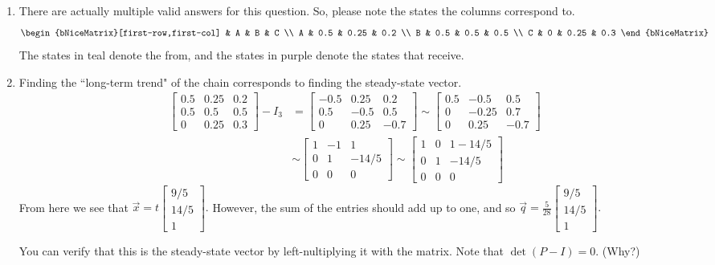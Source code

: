 \begin{enumerate}
	\item[\textbf{Q12}]  There are actually multiple valid answers for this question. So, please note the states the columns correspond to.
			\[
				\begin{bNiceMatrix}[first-row,first-col]
				   	&   A   &   B   &    C   \\
				     A & 0.5  & 0.25 & 0.2 \\
				     B & 0.5  &  0.5  & 0.5 \\
				     C &  0   &  0.25 & 0.3
				\end{bNiceMatrix}
			\]
			The states in teal denote the {\color{teal} from}, and the states in purple denote the states that {\color{purple} receive}.
		\item Finding the ``long-term trend" of the chain corresponds to finding the steady-state vector. 
			\begin{align*}
				\begin{bmatrix}0.5 & 0.25 & 0.2 \\ 0.5 & 0.5 & 0.5 \\ 0 & 0.25 & 0.3\end{bmatrix} - I_3 &= 
				\begin{bmatrix}-0.5 & 0.25 & 0.2 \\ 0.5 & -0.5 & 0.5 \\ 0 & 0.25 & -0.7\end{bmatrix} 
				\sim \begin{bmatrix}0.5 & -0.5 & 0.5 \\ 0 & -0.25 & 0.7 \\ 0 & 0.25 & -0.7\end{bmatrix} \\[0.5em]
				&\sim \begin{bmatrix}1 & -1 & 1 \\ 0 & 1 & - 14/5 \\ 0 & 0 & 0\end{bmatrix} 
				\sim \begin{bmatrix}1 & 0 & 1 - 14/5 \\ 0 & 1 & -14/5 \\ 0 & 0 & 0\end{bmatrix}
			\end{align*}
			From here we see that \(\vec{x} = t\begin{bmatrix}9/5 \\ 14/5 \\ 1\end{bmatrix}.\) However, the sum of the entries should add up to one, and
			so \(\vec{q} = \displaystyle \frac{5}{28}\begin{bmatrix}9/5 \\ 14/5 \\ 1\end{bmatrix}.\)
		
			You can verify that this is the steady-state vector by left-nultiplying it with the matrix. Note that \(\det(P - I) = 0\). (Why?)

\end{enumerate}